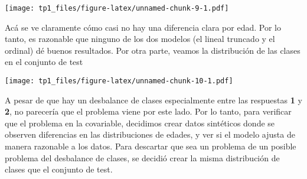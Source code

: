 \documentclass[
]{article}
\newenvironment{Shaded}{\begin{snugshade}}{\end{snugshade}}
\newcommand{\AttributeTok}[1]{\textcolor[rgb]{0.13,0.29,0.53}{#1}}
\newcommand{\FunctionTok}[1]{\textcolor[rgb]{0.13,0.29,0.53}{\textbf{#1}}}
\newcommand{\NormalTok}[1]{#1}
\newcommand{\SpecialCharTok}[1]{\textcolor[rgb]{0.81,0.36,0.00}{\textbf{#1}}}
\newcommand{\StringTok}[1]{\textcolor[rgb]{0.31,0.60,0.02}{#1}}
\begin{document}
\texttt{[image: tp1\_files/figure-latex/unnamed-chunk-9-1.pdf]}

Acá se ve claramente cómo casi no hay una diferencia clara por edad. Por
lo tanto, es razonable que ninguno de los dos modelos (el lineal
truncado y el ordinal) dé buenos resultados. Por otra parte, veamos la
distribución de las clases en el conjunto de test

\begin{Shaded}
\end{Shaded}

\texttt{[image: tp1\_files/figure-latex/unnamed-chunk-10-1.pdf]}

A pesar de que hay un desbalance de clases especialmente entre las
respuestas \textbf{1} y \textbf{2}, no parecería que el problema viene
por este lado. Por lo tanto, para verificar que el problema en la
covariable, decidimos crear datos sintéticos donde se observen
diferencias en las distribuciones de edades, y ver si el modelo ajusta
de manera razonable a los datos. Para descartar que sea un problema de
un posible problema del desbalance de clases, se decidió crear la misma
distribución de clases que el conjunto de test.
\end{document}
